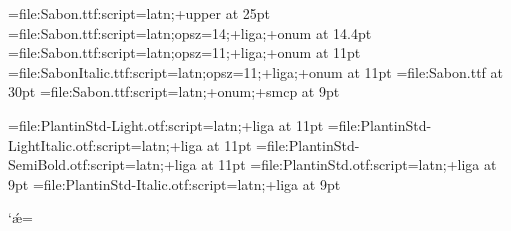 
\font\displayfont=file:Sabon.ttf:script=latn;+upper at 25pt
\font\headerfont=file:Sabon.ttf:script=latn;opsz=14;+liga;+onum at 14.4pt
\font\decorativfont=file:Sabon.ttf:script=latn;opsz=11;+liga;+onum at 11pt
\font\itdecorativfont=file:SabonItalic.ttf:script=latn;opsz=11;+liga;+onum at 11pt
\font{}=file:Sabon.ttf at 30pt
\font\scshapefont=file:Sabon.ttf:script=latn;+onum;+smcp at 9pt

\font\regularfont=file:PlantinStd-Light.otf:script=latn;+liga at 11pt
\font\italicfont=file:PlantinStd-LightItalic.otf:script=latn;+liga at 11pt
\font\boldfont=file:PlantinStd-SemiBold.otf:script=latn;+liga at 11pt
\font\frfont=file:PlantinStd.otf:script=latn;+liga at 9pt
\font\rubricfont=file:PlantinStd-Italic.otf:script=latn;+liga at 9pt

\catcode`ǽ=\active
{}

\newif\ifplantin

\def\display{\plantinfalse\displayfont}
\def\header{\plantinfalse\headerfont}
\def\decorativ{\plantinfalse\decorativfont%
\def\it{\itdecorativfont}%
\def\rm{\decorativfont}}

\def\regular{\plantintrue\regularfont%
\def\it{\italicfont}%
\def\rm{\regularfont}%
\def\bf{\boldfont}}

\def\small{\plantintrue\frfont%
\def\it{\rubricfont}%
\def\rm{\frfont}%
\def\sc{\scshapefont}}
